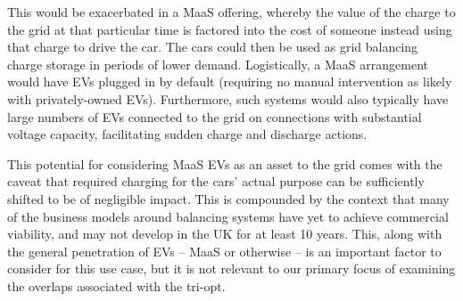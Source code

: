 \documentclass[b5paper,10pt]{article}
\begin{document}
This would be exacerbated in a MaaS offering,
whereby the value of the charge to the grid at that particular time is
factored into the cost of someone instead using that charge to drive
the car. The cars could then be used as grid balancing charge storage
in periods of lower demand. Logistically, a MaaS arrangement would
have EVs plugged in by default (requiring no manual intervention as
likely with privately-owned EVs). Furthermore, such systems would also
typically have large numbers of EVs connected to the grid on
connections with substantial voltage capacity, facilitating sudden
charge and discharge actions.


This potential for considering MaaS EVs as an asset to the grid comes
with the caveat that required charging for the cars' actual purpose
can be sufficiently shifted to be of negligible impact. This is
compounded by the context that many of the business models around
balancing systems have yet to achieve commercial viability, and may
not develop in the UK for at least 10 years. This, along with the
general penetration of EVs -- MaaS or otherwise -- is an important
factor to consider for this use case, but it is not relevant to our
primary focus of examining the overlaps associated with the tri-opt.




\end{document}
